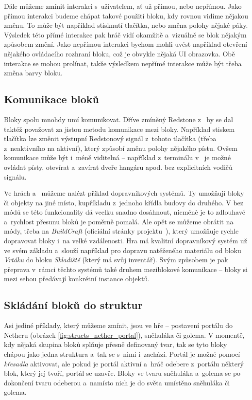Dále můžeme zmínit interakci s~uživatelem, ať už přímou, nebo nepřímou. Jako přímou interakci budeme chápat takové použití bloku, kdy rovnou vidíme nějakou změnu. To může být například stisknutí tlačítka, nebo změna polohy nějaké páky. Výsledek této přímé interakce pak hráč vidí okamžitě a~vizuálně se blok nějakým způsobem změní. Jako nepřímou interakci bychom mohli uvést například otevření nějakého ovládacího rozhraní bloku, což je obvykle nějaká UI obrazovka. Obě interakce se mohou prolínat, takže výsledkem nepřímé interakce může být třeba změna barvy bloku.


\subsection{Komunikace bloků}
Bloky spolu mnohdy umí komunikovat. Dříve zmíněný Redstone z~ by se dal taktéž považovat za jistou metodu komunikace mezi bloky. Například stiskem tlačítka lze změnit výstupní Redstonový signál z~tohoto tlačítka (třeba z~neaktivního na aktivní), který způsobí změnu polohy nějakého pístu. Ovšem komunikace může být i~méně viditelná -- například z~terminálu v~\SE{} je možné ovládat písty, otevírat a~zavírat dveře hangáru apod. bez explicitních vodičů signálu.

Ve hrách \MC{} a~\SE{} můžeme nalézt příklad dopravníkových systémů. Ty umožňují  bloky či objekty na jiné místo, kupříkladu z~jednoho křídla budovy do druhého. V  bez módů se této funkcionality dá vcelku snadno dosáhnout, nicméně je to zdlouhavé a~rychlost přesunu bloků je poměrně pomalá. Ale opět se můžeme obrátit na módy, třeba na \textit{BuildCraft} (oficiální stránky projektu~\citep{buildcraft}), který umožňuje rychle dopravovat bloky i~na velké vzdálenosti. Hra \SE{} má kvalitní dopravníkový systém už ve svém základu a~slouží například pro dopravu natěženého materiálu od bloku \textit{Vrtáku} do bloku \textit{Skladiště} (který má svůj inventář). Svým způsobem je pak přeprava v~rámci těchto systémů také druhem meziblokové komunikace -- bloky si mezi sebou předávají konkrétní instance objektů.

\subsection{Skládání bloků do struktur}
Asi jediné příklady, který můžeme zmínit, jsou ve hře \MC{} -- postavení portálu do Netheru (obrázek \ref{fig:structs_nether_portal}), sněhuláka či golema. V momentě, kdy nějaká skupina bloků splňuje přesně definovaný tvar, tak se tyto bloky chápou jako jedna struktura a~tak se s~nimi i~zachází. Portál je možné pomocí \textit{křesadla} aktivovat, ale pokud je portál aktivní a~hráč odebere z~portálu některý blok, který jej tvoří, portál se uzavře. Bloky ve tvaru sněhuláka a~golema se po dokončení tvaru odeberou a~namísto nich je do světa umístěno \NPC{} sněhuláka či golema.

